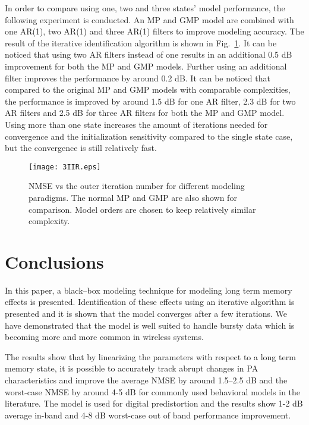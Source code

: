 \documentclass[journal]{IEEEtran}
\begin{document}
In order to compare using one, two and three states' model performance, the following experiment is conducted. An MP and GMP model are combined with one AR(1), two AR(1) and three AR(1) filters to improve modeling accuracy. The result of the iterative identification algorithm is shown in Fig.~\ref{3IIR}. It can be noticed that using two AR filters instead of one results in an additional 0.5 dB improvement for both the MP and GMP models. Further using an additional filter improves the performance by around 0.2 dB. It can be noticed that compared to the original MP and GMP models with comparable complexities, the performance is improved by around 1.5 dB for one AR filter, 2.3 dB for two AR filters and 2.5 dB for three AR filters for both the MP and GMP model. Using more than one state increases the amount of iterations needed for convergence and the initialization sensitivity compared to the single state case, but the convergence is still relatively fast.
\begin{figure}
\centering
\texttt{[image: 3IIR.eps]}
\caption{NMSE vs the outer iteration number for different modeling paradigms. The normal MP and GMP are also shown for comparison. Model orders are chosen to keep relatively similar complexity.} \label{3IIR}
\end{figure}

\section{Conclusions}
In this paper, a black--box modeling technique for modeling long term memory effects is presented. Identification of these effects using an iterative algorithm is presented and it is shown that the model converges after a few iterations. We have demonstrated that the model is well suited to handle bursty data which is becoming more and more common in wireless systems.

The results show that by linearizing the parameters with respect to a long term memory state, it is possible to accurately track abrupt changes in PA characteristics and improve the average NMSE by around 1.5--2.5 dB and the worst-case NMSE by around 4-5 dB for commonly used behavioral models in the literature. The model is used for digital predistortion and the results show 1-2 dB average in-band and 4-8 dB worst-case out of band performance improvement.

\renewcommand{\theequation}{A.\arabic{equation}}
\setcounter{equation}{0}
\end{document}
